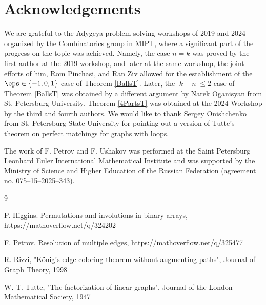 \documentclass[12pt]{article}
\theoremstyle{definition}
\theoremstyle{plain}
\begin{document}
\section{Acknowledgements}

We are grateful to the Adygeya problem solving workshops of 2019
and 2024 organized by the Combinatorics group in MIPT, where a significant part of the progress on 
the topic was achieved. Namely, the case $n=k$ was 
proved by the first author at the 2019 workshop, and later at the
same workshop, the joint efforts of him, Rom Pinchasi, and Ran Ziv allowed for the 
establishment of the $\eps \in \{-1,0,1\}$ case of Theorem \ref{BallsT}. Later,
the $|k-n|\leqslant 2$ case of  Theorem \ref{BallsT}
was obtained by a different argument by Narek Oganisyan
from St. Petersburg University. 
Theorem \ref{4PartsT} was obtained at the 2024 Workshop
by the third and fourth authors.
We would like to thank Sergey Onishchenko from St. Petersburg State University for pointing out a version of Tutte's theorem on perfect matchings for graphs with loops.

The work of F. Petrov and F. Ushakov was performed at the Saint Petersburg Leonhard Euler
International Mathematical Institute and was supported by the Ministry of Science and Higher
Education of the Russian Federation (agreement no. 075–15–2025–343).


\begin{thebibliography}{9}%


 P. Higgins. Permutations and involutions in binary arrays, https://mathoverflow.net/q/324202

 F. Petrov. Resolution of multiple edges, https://mathoverflow.net/q/325477

 R. Rizzi, "König's edge coloring theorem without augmenting paths", Journal of Graph Theory, 1998

 W. T. Tutte, "The factorization of linear graphs", Journal of the London Mathematical Society, 1947

\end{thebibliography}
\end{document}
